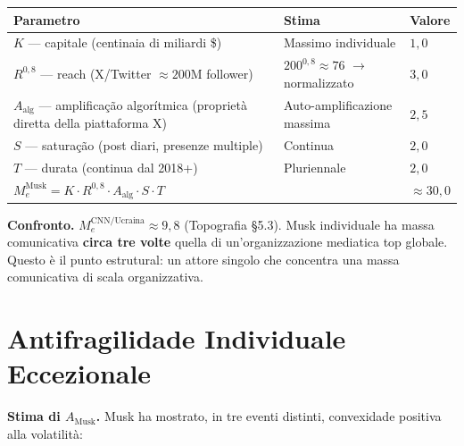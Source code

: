 {\def\LTcaptype{none} %
{\small\begin{longtable}[]{@{}
  >{\raggedright\arraybackslash}p{}
  >{\raggedright\arraybackslash}p{}
  >{\raggedright\arraybackslash}p{}@{}}
\toprule\noalign{}
\begin{minipage}[b]{\linewidth}\raggedright
Parametro
\end{minipage} & \begin{minipage}[b]{\linewidth}\raggedright
Stima
\end{minipage} & \begin{minipage}[b]{\linewidth}\raggedright
Valore
\end{minipage} \\
\midrule\noalign{}
\endhead
\bottomrule\noalign{}
\endlastfoot
\(K\) --- capitale (centinaia di miliardi \$) & Massimo individuale &
\(1{,}0\) \\
\(R^{0{,}8}\) --- reach (X/Twitter \(\approx 200\)M follower) &
\(200^{0{,}8} \approx 76\) $\to$ normalizzato & \(3{,}0\) \\
\(A_{\text{alg}}\) --- amplificação algorítmica (proprietà diretta
della piattaforma X) & Auto-amplificazione massima & \(2{,}5\) \\
\(S\) --- saturação (post diari, presenze multiple) & Continua &
\(2{,}0\) \\
\(T\) --- durata (continua dal 2018+) & Pluriennale & \(2{,}0\) \\
\textbf{\(M_e^{\text{Musk}} = K \cdot R^{0{,}8} \cdot A_{\text{alg}} \cdot S \cdot T\)}
& & \textbf{\(\approx 30{,}0\)} \\
\end{longtable}}
}

\Hypoth{} \textbf{Confronto.} \(M_e^{\text{CNN/Ucraina}} \approx 9{,}8\)
(Topografia \S{}5.3). Musk individuale ha massa comunicativa \textbf{circa
tre volte} quella di un'organizzazione mediatica top globale. Questo è
il punto estrutural: un attore singolo che concentra una massa
comunicativa di scala organizzativa.



\section{Antifragilidade Individuale
Eccezionale}\label{antifragilituxe0-individuale-eccezionale}

\Hypoth{} \textbf{Stima di \(A_{\text{Musk}}\).} Musk ha mostrato, in
tre eventi distinti, convexidade positiva alla volatilità:

